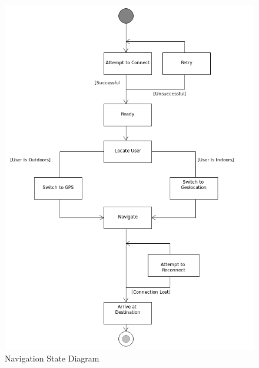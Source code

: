 \documentclass{article}
\begin{document}
	\begin{figure}[h]
		\caption{Navigation State Diagram}
  		\includegraphics[width=\textwidth]{Images/NavigationState.png}
	\end{figure}
	\FloatBarrier	
\end{document}
